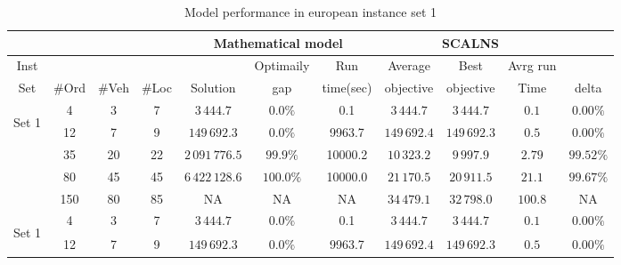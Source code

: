 \documentclass[../main.tex]{subfiles}
\begin{document}
\begin{table}
    \centering
    \caption{Model performance in european instance set 1}
    \begin{adjustbox}{width=0.95\columnwidth,center}
            \begin{tabular}{|cccc|ccc|ccc|c|}
                \hline
                    &    &       &       & \multicolumn{3}{c}{Mathematical model}    & \multicolumn{3}{|c|}{SCALNS}                & \\
                \hline
                    Inst&           &       &       &               & Optimaily     & Run       & Average       & Best      & Avrg run      &              \\ 
                    Set & #Ord      & #Veh  & #Loc  & Solution      & gap           & time(sec) & objective     & objective & Time          & delta        \\ 
            \hline
                \multirow{5}{*}{\begin{sideways} Set 1 \end{sideways}}  
                        & 4       & 3     & 7     & $3\,444.7$      & $0.0\%$       & 0.1       & $3\,444.7$    & $3\,444.7$    & $0.1$        & $0.00\%$  \\
                        & 12      & 7     & 9     & $149\,692.3$    & $0.0\%$       & 9963.7    & $149\,692.4$   & $149\,692.3$  & $0.5$   & $0.00\%$  \\
                        & 35      & 20    & 22    & $2\,091\,776.5$ & $99.9\%$      & 10000.2   & $10\,323.2$   & $9\,997.9$      & $2.79$   & $99.52\%$  \\
                        & 80      & 45    & 45    & $6\,422\,128.6$ & $100.0\%$     & 10000.0   & $21\,170.5$   & $20\,911.5$  & $21.1$   & $99.67\%$  \\
                        & 150     & 80    & 85    & NA              & NA            & NA        & $34\,479.1$   & $32\,798.0$  & $100.8$   & NA  \\
            \hline
                \multirow{5}{*}{\begin{sideways} Set 1 \end{sideways}}  
                        & 4       & 3     & 7     & $3\,444.7$      & $0.0\%$       & 0.1       & $3\,444.7$    & $3\,444.7$    & $0.1$        & $0.00\%$  \\
                        & 12      & 7     & 9     & $149\,692.3$    & $0.0\%$       & 9963.7    & $149\,692.4$   & $149\,692.3$  & $0.5$   & $0.00\%$  \\

\end{tabular}
\end{adjustbox}
\end{table}
\end{document}
